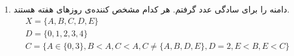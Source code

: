 \begin{enumerate}
    \item دامنه را برای سادگی عدد گرفتم. هر کدام مشخص کننده‌ی روز‌‌های هفته هستند. \begin{gather*}
        X = \{A, B, C, D, E\}\\
        D = \{0, 1, 2, 3, 4\}\\
        C = \{A \in \{0, 3\}, B < A, C < A, C \neq \{A, B, D, E\}, D = 2, E < B, E < C\}
    \end{gather*}
\end{enumerate}
